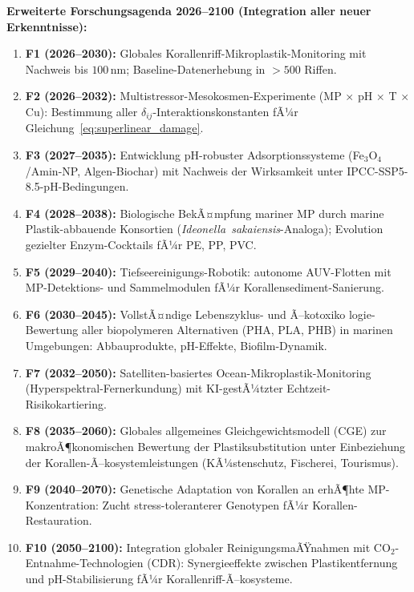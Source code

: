 ﻿\documentclass[12pt,a4paper]{article}
\theoremstyle{definition}
\theoremstyle{remark}
\newcommand{\MP}{Mikroplastik}
\begin{document}
\begin{mdframed}[backgroundcolor=boxblue, linecolor=deepblue, linewidth=1.5pt]
\textbf{Erweiterte Forschungsagenda 2026--2100 (Integration aller neuer Erkenntnisse):}
\begin{enumerate}[noitemsep, leftmargin=*, label=\textbf{F\arabic*.}]
  \item \textbf{F1 (2026--2030):} Globales Korallenriff-\MP{}-Monitoring
    mit Nachweis bis $100$\,nm; Baseline-Datenerhebung in $>500$ Riffen.
  \item \textbf{F2 (2026--2032):} Multistressor-Mesokosmen-Experimente
    (MP $\times$ pH $\times$ T $\times$ Cu): Bestimmung aller $\delta_{ij}$-Interaktionskonstanten
    fÃ¼r Gleichung~\eqref{eq:superlinear_damage}.
  \item \textbf{F3 (2027--2035):} Entwicklung pH-robuster Adsorptionssysteme
    (Fe$_3$O$_4$/Amin-NP, Algen-Biochar) mit Nachweis der Wirksamkeit
    unter IPCC-SSP5-8.5-pH-Bedingungen.
  \item \textbf{F4 (2028--2038):} Biologische BekÃ¤mpfung mariner MP durch
    marine Plastik-abbauende Konsortien (\textit{Ideonella~sakaiensis}-Analoga);
    Evolution gezielter Enzym-Cocktails fÃ¼r PE, PP, PVC.
  \item \textbf{F5 (2029--2040):} Tiefseereinigungs-Robotik: autonome AUV-Flotten
    mit MP-Detektions- und Sammelmodulen fÃ¼r Korallensediment-Sanierung.
  \item \textbf{F6 (2030--2045):} VollstÃ¤ndige Lebenszyklus- und Ã–kotoxiko\-
    logie-Bewertung aller biopolymeren Alternativen (PHA, PLA, PHB) in
    marinen Umgebungen: Abbauprodukte, pH-Effekte, Biofilm-Dynamik.
  \item \textbf{F7 (2032--2050):} Satelliten-basiertes Ocean-\MP{}-Monitoring
    (Hyper\-spektral-Fernerkundung) mit KI-gestÃ¼tzter Echtzeit-Risikokartiering.
  \item \textbf{F8 (2035--2060):} Globales allgemeines Gleichgewichtsmodell (CGE)
    zur makroÃ¶konomischen Bewertung der Plastiksubstitution unter Einbeziehung
    der Korallen-Ã–kosystemleistungen (KÃ¼stenschutz, Fischerei, Tourismus).
  \item \textbf{F9 (2040--2070):} Genetische Adaptation von Korallen an erhÃ¶hte
    MP-Konzen\-tration: Zucht stress-toleranterer Genotypen fÃ¼r Korallen-Restauration.
  \item \textbf{F10 (2050--2100):} Integration globaler ReinigungsmaÃŸnahmen mit
    CO$_2$-Ent\-nahme-Technologien (CDR): Synergieeffekte zwischen Plastikentfernung
    und pH-Stabilisierung fÃ¼r Korallenriff-Ã–kosysteme.
\end{enumerate}
\end{mdframed}
\end{document}
